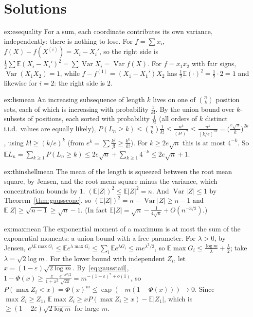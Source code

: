 \section{Solutions}

\begin{solution}{ex:esequality}
\idea For a sum, each coordinate contributes its own variance, independently: there is nothing to lose.
\writeup For $f=\sum x_i$, $f(X)-f(X^{(i)})=X_i-X_i'$, so the right side is $\frac12\sum\mathbb E(X_i-X_i')^2=\sum\operatorname{Var}X_i=\operatorname{Var}f(X)$. For $f=x_1x_2$ with fair signs, $\operatorname{Var}(X_1X_2)=1$,
while $f-f^{(1)}=(X_1-X_1')X_2$ has $\frac12\mathbb E(\cdot)^2=\frac12\cdot2=1$ and likewise for $i=2$: the right side is $2$.
\end{solution}

\begin{solution}{ex:lismean}
\idea An increasing subsequence of length $k$ lives on one of $\binom nk$ position sets, each of which is increasing with probability $\frac1{k!}$.
\writeup By the union bound over $k$-subsets of positions, each sorted with probability $\frac1{k!}$ (all orders of $k$ distinct i.i.d.\ values are equally likely),
$P(L_n\ge k)\le\binom nk\frac1{k!}\le\frac{n^k}{(k!)^2}\le\frac{n^k}{(k/e)^{2k}}=\bigl(\frac{e\sqrt n}k\bigr)^{2k}$, using $k!\ge(k/e)^k$ (from $e^k=\sum\frac{k^j}{j!}\ge\frac{k^k}{k!}$). For $k\ge2e\sqrt n$ this is at most $4^{-k}$. So
$\mathbb EL_n=\sum_{k\ge1}P(L_n\ge k)\le2e\sqrt n+\sum_{k\ge1}4^{-k}\le2e\sqrt n+1$.
\end{solution}

\begin{solution}{ex:thinshellmean}
\idea The mean of the length is squeezed between the root mean square, by Jensen, and the root mean square minus the variance, which concentration bounds by $1$.
\writeup $(\mathbb E|Z|)^2\le\mathbb E|Z|^2=n$. And $\operatorname{Var}|Z|\le1$ by Theorem~\ref{thm:gaussconc}, so $(\mathbb E|Z|)^2=n-\operatorname{Var}|Z|\ge n-1$ and $\mathbb E|Z|\ge\sqrt{n-1}\ge\sqrt n-1$. (In
fact $\mathbb E|Z|=\sqrt n-\frac1{4\sqrt n}+O(n^{-3/2})$.)
\end{solution}

\begin{solution}{ex:maxmean}
\idea The exponential moment of a maximum is at most the sum of the exponential moments: a union bound with a free parameter.
\writeup For $\lambda>0$, by Jensen, $e^{\lambda\mathbb E\max G_i}\le\mathbb Ee^{\lambda\max G_i}\le\sum_i\mathbb Ee^{\lambda G_i}\le me^{\lambda^2/2}$, so $\mathbb E\max G_i\le\frac{\log m}\lambda+\frac\lambda2$; take $\lambda=\sqrt{2\log m}$.
For the lower bound with independent $Z_i$, let $x=(1-\varepsilon)\sqrt{2\log m}$. By~\eqref{eq:gausstail}, $1-\Phi(x)\ge\frac x{1+x^2}\frac{e^{-x^2/2}}{\sqrt{2\pi}}=m^{-(1-\varepsilon)^2+o(1)}$, so
$P(\max Z_i<x)=\Phi(x)^m\le\exp(-m(1-\Phi(x)))\to0$. Since $\max Z_i\ge Z_1$, $\mathbb E\max Z_i\ge xP(\max Z_i\ge x)-\mathbb E|Z_1|$, which is $\ge(1-2\varepsilon)\sqrt{2\log m}$ for large $m$.
\end{solution}

